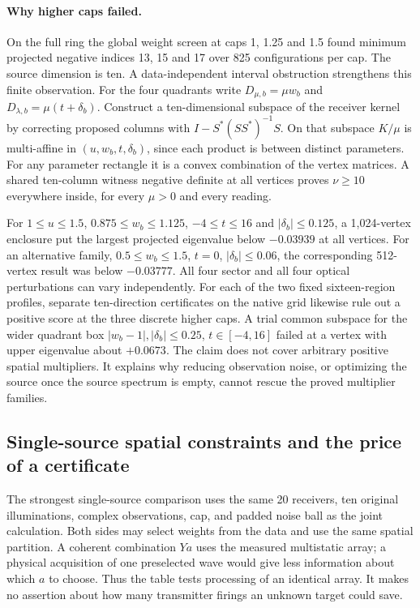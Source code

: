 \documentclass[anonymous,12pt]{iopjournal}
\theoremstyle{remark}\newtheorem{remark}[theorem]{Remark}
\numberwithin{equation}{section}
\begin{document}
\paragraph{Why higher caps failed.}
On the full ring the global weight screen at caps 1, 1.25 and 1.5 found minimum projected negative indices 13, 15 and 17 over 825 configurations per cap. The source dimension is ten. A data-independent interval obstruction strengthens this finite observation. For the four quadrants write $D_{\mu,b}=\mu w_b$ and $D_{\lambda,b}=\mu(t+\delta_b)$. Construct a ten-dimensional subspace of the receiver kernel by correcting proposed columns with $I-S^*(SS^*)^{-1}S$. On that subspace $K/\mu$ is multi-affine in $(u,w_b,t,\delta_b)$, since each product is between distinct parameters. For any parameter rectangle it is a convex combination of the vertex matrices. A shared ten-column witness negative definite at all vertices proves $\nu\ge10$ everywhere inside, for every $\mu>0$ and every reading.

For $1\le u\le1.5$, $0.875\le w_b\le1.125$, $-4\le t\le16$ and $|\delta_b|\le0.125$, a 1,024-vertex enclosure put the largest projected eigenvalue below $-0.03939$ at all vertices. For an alternative family, $0.5\le w_b\le1.5$, $t=0$, $|\delta_b|\le0.06$, the corresponding 512-vertex result was below $-0.03777$. All four sector and all four optical perturbations can vary independently. For each of the two fixed sixteen-region profiles, separate ten-direction certificates on the native grid likewise rule out a positive score at the three discrete higher caps. A trial common subspace for the wider quadrant box $|w_b-1|,|\delta_b|\le0.25$, $t\in[-4,16]$ failed at a vertex with upper eigenvalue about $+0.0673$. The claim does not cover arbitrary positive spatial multipliers. It explains why reducing observation noise, or optimizing the source once the source spectrum is empty, cannot rescue the proved multiplier families.

\subsection{Single-source spatial constraints and the price of a certificate}\label{sec:energy}
The strongest single-source comparison uses the same 20 receivers, ten original illuminations, complex observations, cap, and padded noise ball as the joint calculation. Both sides may select weights from the data and use the same spatial partition. A coherent combination $Ya$ uses the measured multistatic array; a physical acquisition of one preselected wave would give less information about which $a$ to choose. Thus the table tests processing of an identical array. It makes no assertion about how many transmitter firings an unknown target could save.
\end{document}
